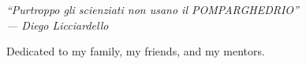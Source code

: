 \cleardoublepage
{}
\thispagestyle{empty}

\vspace*{3cm}

\begin{center}
    \slshape
    ``Purtroppo gli scienziati non usano il POMPARGHEDRIO'' \\ \medskip
    --- Diego Licciardello
\end{center}

\medskip

\begin{center}
    Dedicated to my family, my friends, and my mentors.
\end{center}